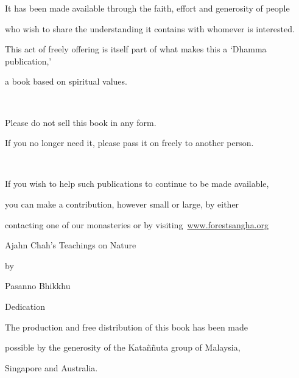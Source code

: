\documentclass[a4paper,portrait,12pt]{article}
\begin{document}
It has been made available through the faith, effort and generosity of people


who wish to share the understanding it contains with whomever is interested.


This act of freely offering is itself part of what makes this a `Dhamma publication,'


a book based on spiritual values.


 


Please do not sell this book in any form.


If you no longer need it, please pass it on freely to another person.


 


If you wish to help such publications to continue to be made available,


you can make a contribution, however small or large, by either


{\small contacting one of our monasteries or by visiting }\href{http://www.forestsangha.org/}{{\small www.forestsangha.org}}


























Ajahn Chah's  Teachings on Nature  


 


by  


Pasanno Bhikkhu   

















Dedication 


 


The production and free distribution of this book has been made


possible by the generosity of the Kata\~{n}\~{n}uta group of Malaysia, 


Singapore and Australia.
\end{document}
